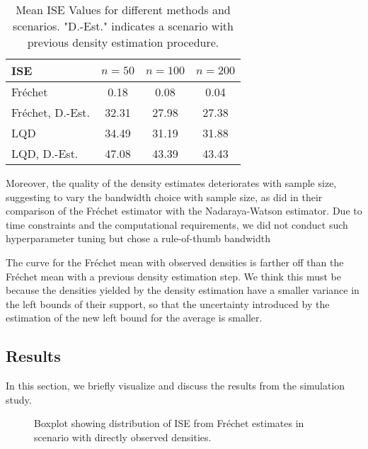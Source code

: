 \begin{table}[h]
    \centering
    \begin{tabular}{lccc}
        \hline
        ISE & $n = 50$ & $n = 100$ & $n = 200$ \\
        \hline
        Fréchet             & 0.18 & 0.08 & 0.04 \\
        Fréchet, D.-Est.    & 32.31 & 27.98 & 27.38 \\
        LQD                 & 34.49 & 31.19 & 31.88 \\
        LQD, D.-Est.        & 47.08 & 43.39 & 43.43 \\
        \hline
    \end{tabular}
    \caption{Mean ISE Values for different methods and scenarios. "D.-Est." indicates
    a scenario with previous density estimation procedure.}
\end{table}

Moreover, the quality of the density estimates deteriorates with sample size, suggesting
to vary the bandwidth choice with sample size, as \textcite{PetersenMüller2019} did in
their comparison of the Fréchet estimator with the Nadaraya-Watson estimator. Due to
time constraints and the computational requirements, we did not conduct such
hyperparameter tuning but chose a rule-of-thumb bandwidth
\parencites[Chapter~3.4.1]{Silverman1986}[Chapter~2.2.1]{LiRacine2007}

The curve for the Fréchet mean with observed densities is farther off than the Fréchet
mean with a previous density estimation step. We think this must be because the densities
yielded by the density estimation have a smaller variance in the left bounds of their
support, so that the uncertainty introduced by the estimation of the new left bound for
the average is smaller.

\subsection{Results}
\label{sec:sim_results}
In this section, we briefly visualize and discuss the results from the simulation study.

\begin{figure}[h]
    \centering
    \resizebox{1\textwidth}{!}{}
    \caption[Simulation results: ISE boxplot --- Fréchet method with observed densities]{Boxplot showing distribution of
    ISE from Fréchet estimates in scenario with directly observed densities.}
    \label{fig:ise_frechet}
\end{figure}

